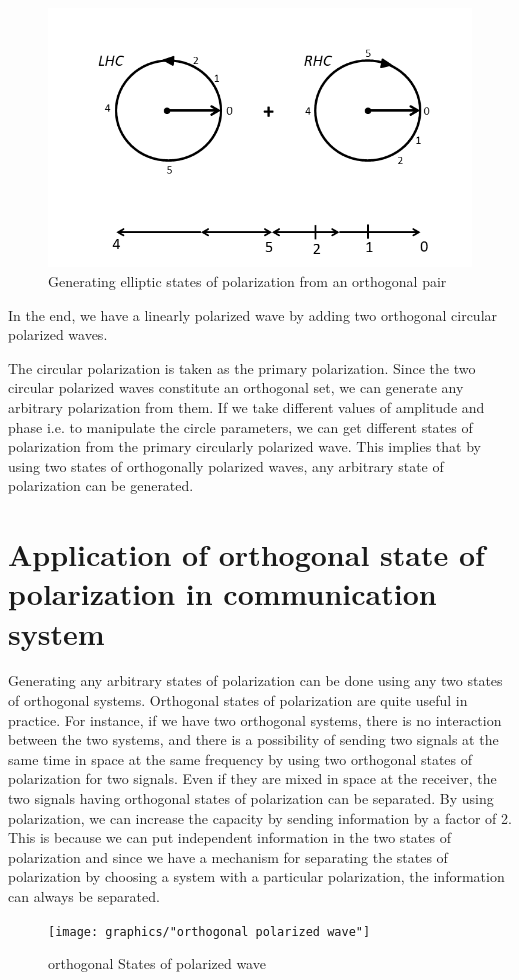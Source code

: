 \begin{figure}[h]
\centering
\includegraphics[width=1\linewidth]{graphics/generatingEP}
\caption{Generating elliptic states of polarization from an orthogonal pair}
\label{fig:linear-polarized}
\end{figure}

In the end, we have a linearly polarized wave by adding two orthogonal circular polarized waves.

The circular polarization is taken as the primary polarization. Since the two circular polarized waves constitute an orthogonal set, we can generate any arbitrary polarization from them. If we take different values of amplitude and phase i.e. to manipulate the circle parameters, we can get different states of polarization from the primary circularly polarized wave. This implies that by using two states of orthogonally polarized waves, any arbitrary state of polarization can be generated.

\section{Application of orthogonal state of polarization in communication system}	
Generating any arbitrary states of polarization can be done using any two states of orthogonal systems. Orthogonal states of polarization are quite useful in practice. For instance, if we have two orthogonal systems, there is no interaction between the two systems, and there is a possibility of sending two signals at the same time in space at the same frequency by using two orthogonal states of polarization for two signals. Even if they are mixed in space at the receiver, the two signals having orthogonal states of polarization can be separated. By using polarization, we can increase the capacity by sending information by a factor of 2. This is because we can put independent information in the two states of polarization and since we have a mechanism for separating the states of polarization by choosing a system with a particular polarization, the information can always be separated.	
\begin{figure}[h]
\centering
\texttt{[image: graphics/"orthogonal polarized wave"]}
\caption{orthogonal States of polarized wave}
\label{fig:orthogonal-polarized-wave}
\end{figure}



